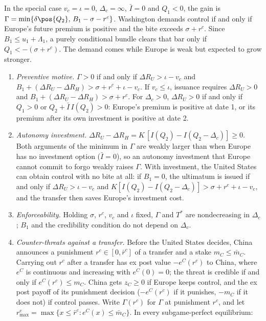 In the special case $v_c=\iota=0$, $\Delta_c=\infty$, $\bar I=0$ and $Q_1<0$, the gain is $\Gamma=\min\{\delta\pos{Q_2},\,B_1-\sigma-r^c\}$. Washington demands control if and only if Europe's future premium is positive and the bite exceeds $\sigma+r^c$. Since $B_1\le u_1+\Lambda_1$, a purely conditional bundle clears that bar only if $Q_1<-(\sigma+r^c)$. The demand comes while Europe is weak but expected to grow stronger.

\begin{corollary}\label{cor:control}
\leavevmode
\begin{enumerate}[label=(\alph*)]
\item \emph{Preventive motive.} $\Gamma>0$ if and only if $\Delta R_U>\iota-v_c$ and $B_1+(\Delta R_U-\Delta R_H)>\sigma+r^c+\iota-v_c$. If $v_c\le\iota$, issuance requires $\Delta R_U>0$ and $B_1+(\Delta R_U-\Delta R_H)>\sigma+r^c$. For $\Delta_c>0$, $\Delta R_U>0$ if and only if $Q_1>0$ or $Q_2+\bar I\,I(Q_2)>0$: Europe's premium is positive at date 1, or its premium after its own investment is positive at date 2.
\item \emph{Autonomy investment.} $\Delta R_U-\Delta R_H=K\,[I(Q_2)-I(Q_2-\Delta_c)]\ge 0$. Both arguments of the minimum in $\Gamma$ are weakly larger than when Europe has no investment option ($\bar I=0$), so an autonomy investment that Europe cannot commit to forgo weakly raises $\Gamma$. With investment, the United States can obtain control with no bite at all: if $B_1=0$, the ultimatum is issued if and only if $\Delta R_U>\iota-v_c$ and $K[I(Q_2)-I(Q_2-\Delta_c)]>\sigma+r^c+\iota-v_c$, and the transfer then saves Europe's investment cost.
\item \emph{Enforceability.} Holding $\sigma$, $r^c$, $v_c$ and $\iota$ fixed, $\Gamma$ and $T^*$ are nondecreasing in $\Delta_c$; $B_1$ and the credibility condition do not depend on $\Delta_c$.
\item \emph{Counter-threats against a transfer.} Before the United States decides, China announces a punishment $r^c\in[0,\bar r^c]$ of a transfer and a stake $m_C\le\bar m_C$. Carrying out $r^c$ after a transfer has ex post value $-e^C(r^c)$ to China, where $e^C$ is continuous and increasing with $e^C(0)=0$; the threat is credible if and only if $e^C(r^c)\le m_C$. China gets $z_C\ge 0$ if Europe keeps control, and the ex post payoff of its punishment decision ($-e^C(r^c)$ if it punishes, $-m_C$ if it does not) if control passes. Write $\Gamma(r^c)$ for $\Gamma$ at punishment $r^c$, and let $r^c_{\max}=\max\{x\le\bar r^c:e^C(x)\le\bar m_C\}$. In every subgame-perfect equilibrium:

\end{enumerate}
\end{corollary}
